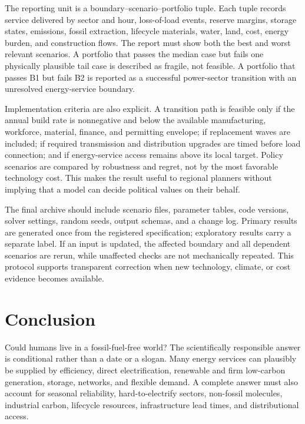 \documentclass[conference]{IEEEtran}
\begin{document}
The reporting unit is a boundary--scenario--portfolio tuple. Each tuple records service delivered by sector and hour, loss-of-load events, reserve margins, storage states, emissions, fossil extraction, lifecycle materials, water, land, cost, energy burden, and construction flows. The report must show both the best and worst relevant scenarios. A portfolio that passes the median case but fails one physically plausible tail case is described as fragile, not feasible. A portfolio that passes B1 but fails B2 is reported as a successful power-sector transition with an unresolved energy-service boundary.

Implementation criteria are also explicit. A transition path is feasible only if the annual build rate is nonnegative and below the available manufacturing, workforce, material, finance, and permitting envelope; if replacement waves are included; if required transmission and distribution upgrades are timed before load connection; and if energy-service access remains above its local target. Policy scenarios are compared by robustness and regret, not by the most favorable technology cost. This makes the result useful to regional planners without implying that a model can decide political values on their behalf.

The final archive should include scenario files, parameter tables, code versions, solver settings, random seeds, output schemas, and a change log. Primary results are generated once from the registered specification; exploratory results carry a separate label. If an input is updated, the affected boundary and all dependent scenarios are rerun, while unaffected checks are not mechanically repeated. This protocol supports transparent correction when new technology, climate, or cost evidence becomes available.

\section{Conclusion}
\label{sec:conclusion}
Could humans live in a fossil-fuel-free world? The scientifically responsible answer is conditional rather than a date or a slogan. Many energy services can plausibly be supplied by efficiency, direct electrification, renewable and firm low-carbon generation, storage, networks, and flexible demand. A complete answer must also account for seasonal reliability, hard-to-electrify sectors, non-fossil molecules, industrial carbon, lifecycle resources, infrastructure lead times, and distributional access.
\end{document}
